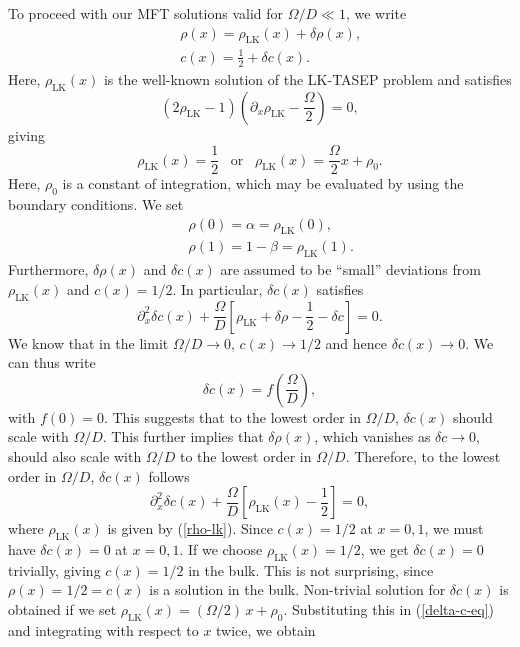 \documentclass[aps,pre,twocolumn,superscriptaddress,amsmath,amssymb,longbibliography,floatfix]{revtex4}
\begin{document}
{To proceed with our MFT solutions valid for $\Omega/D\ll 1$, we write
\begin{eqnarray}
 &&\rho(x)=\rho_\text{LK}(x) + \delta\rho(x), \label{del-rho-def}\\ 
 && c(x) = \frac{1}{2} + \delta c(x). \label{del-c-def}
\end{eqnarray}
Here, $\rho_\text{LK}(x)$ is the well-known solution of the LK-TASEP problem and satisfies
\begin{equation}
 (2\rho_\text{LK}-1)(\partial_x \rho_\text{LK}-\frac{\Omega}{2})=0,
\end{equation}
giving
\begin{equation}
 \rho_\text{LK}(x)=\frac{1}{2}\;\;\;\text{or}\;\;\;\rho_\text{LK}(x)= \frac{\Omega}{2}x+\rho_0.\label{rho-lk}
\end{equation}
Here, $\rho_0$ is a constant of integration, which may be evaluated by using the boundary conditions. We set
\begin{eqnarray}
 &&\rho(0)=\alpha=\rho_\text{LK}(0),\label{bc-1}\\
 &&\rho(1)=1-\beta = \rho_\text{LK}(1).\label{bc-2}
\end{eqnarray}
Furthermore, $\delta\rho(x)$ and $\delta c(x)$ are assumed to be ``small'' deviations from $\rho_\text{LK}(x)$ and $c(x)=1/2$. In particular, $\delta c(x)$ satisfies
\begin{equation}
 \partial_x^2 \delta c(x)+ \frac{\Omega}{D}\left[\rho_\text{LK}+\delta\rho - \frac{1}{2}-\delta c\right]=0.
\end{equation}
We know that in the limit $\Omega/D\rightarrow 0$, $c(x)\rightarrow 1/2$ and hence $\delta c(x)\rightarrow 0$. We can thus write
\begin{equation}
 \delta c(x) = f (\frac{\Omega}{D}),
\end{equation}
with $f(0)=0$. This suggests that to the lowest order in $\Omega/D$, $\delta c(x)$ should scale with $\Omega/D$. This further implies that $\delta \rho(x)$, which vanishes as $\delta c\rightarrow 0$, should also scale with $\Omega/D$ to the lowest order in $\Omega/D$. Therefore, to the lowest order in $\Omega/D$, $\delta c(x)$ follows
\begin{equation}
 \partial_x^2 \delta c(x) +\frac{\Omega}{D}[\rho_\text{LK}(x)-\frac{1}{2}]=0, \label{delta-c-eq}
\end{equation}
where $\rho_\text{LK}(x)$ is given by (\ref{rho-lk}). Since $c(x)=1/2$ at $x=0,1$, we must have $\delta c(x)=0$ at $x=0,1$. If we choose $\rho_\text{LK}(x)=1/2$, we get $\delta c(x)=0$ trivially, giving $c(x)=1/2$ in the bulk. This is not surprising, since $\rho(x)=1/2=c(x)$ is a solution in the bulk. Non-trivial solution for $\delta c(x)$ is obtained if we set $\rho_\text{LK}(x)= (\Omega/2)\, x+\rho_0$. Substituting this in (\ref{delta-c-eq}) and integrating with respect to $x$ twice, we obtain
}
\end{document}
